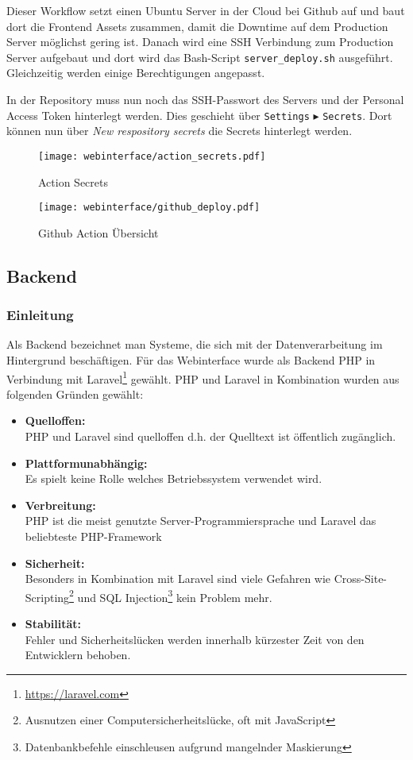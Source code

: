 Dieser Workflow setzt einen Ubuntu Server in der Cloud bei Github auf und baut
dort die Frontend Assets zusammen, damit die Downtime auf dem Production Server
möglichst gering ist. Danach wird eine SSH Verbindung zum Production Server
aufgebaut und dort wird das Bash-Script \verb|server_deploy.sh| ausgeführt.
Gleichzeitig werden einige Berechtigungen angepasst.

In der Repository muss nun noch das SSH-Passwort des Servers und der Personal Access Token
hinterlegt werden. Dies geschieht über \verb|Settings| $\blacktriangleright$
\verb|Secrets|. Dort können nun über \textit{New respository secrets} die Secrets
hinterlegt werden.

\begin{figure}[H]
  \centering
  \texttt{[image: webinterface/action\_secrets.pdf]}
  \caption{Action Secrets}
\end{figure}

\begin{figure}[H]
  \centering
  \texttt{[image: webinterface/github\_deploy.pdf]}
  \caption{Github Action Übersicht}
\end{figure}

\subsection{Backend}

\subsubsection{Einleitung}
Als Backend bezeichnet man Systeme, die sich mit der Datenverarbeitung im
Hintergrund beschäftigen. Für das Webinterface wurde als Backend PHP in
Verbindung mit Laravel\footnote{\url{https://laravel.com}} gewählt. PHP und Laravel in Kombination wurden aus
folgenden Gründen gewählt:

\begin{itemize}
  \item \textbf{Quelloffen:}\\
  PHP und Laravel sind quelloffen d.h. der Quelltext ist öffentlich zugänglich.
  \item \textbf{Plattformunabhängig:}\\
  Es spielt keine Rolle welches Betriebssystem verwendet wird.
  \item \textbf{Verbreitung:}\\
  PHP ist die meist genutzte Server-Programmiersprache und Laravel das
  beliebteste PHP-Framework
  \item \textbf{Sicherheit:}\\
  Besonders in Kombination mit Laravel sind viele Gefahren wie
  Cross-Site-Scripting\footnote{Ausnutzen einer Computersicherheitslücke, oft
  mit JavaScript} und SQL Injection\footnote{Datenbankbefehle einschleusen
  aufgrund mangelnder Maskierung} kein Problem mehr.
  \item \textbf{Stabilität:}\\
  Fehler und Sicherheitslücken werden innerhalb kürzester Zeit von den
  Entwicklern behoben.
\end{itemize}

